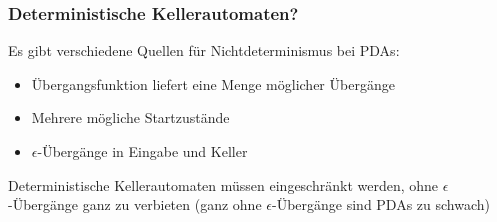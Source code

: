 \documentclass[aspectratio=1610,onlymath]{beamer}
\begin{document}
% 
% 
% 
% 

% 
% 
% 


\begin{frame}\frametitle{Deterministische Kellerautomaten?}

Es gibt verschiedene Quellen für Nichtdeterminismus bei PDAs\pause:
\begin{itemize}
\item Übergangsfunktion liefert eine Menge möglicher Übergänge\pause
\item Mehrere mögliche Startzustände\pause
\item $\epsilon$-Übergänge in Eingabe und Keller\medskip

\end{itemize}

Deterministische Kellerautomaten müssen eingeschränkt werden, ohne 
$\epsilon$-Übergänge ganz zu verbieten (ganz ohne $\epsilon$-Übergänge sind PDAs zu schwach)

\end{frame}
\end{document}
